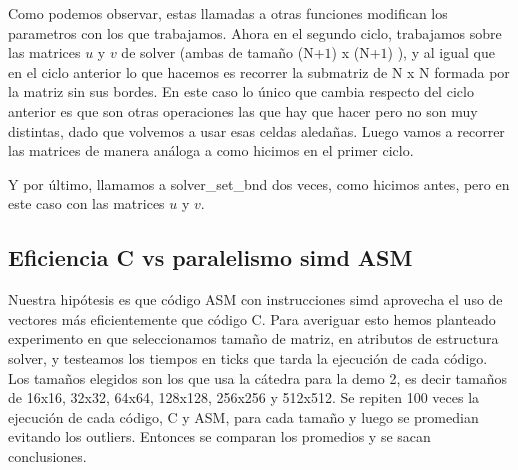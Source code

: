 \par Como podemos observar, estas llamadas a otras funciones modifican los parametros con los que trabajamos.
Ahora en el segundo ciclo, trabajamos sobre las matrices $u$ y $v$ de solver (ambas de tamaño (N+$1$) x (N+$1$) ), y al igual que en el ciclo anterior lo que hacemos es recorrer la submatriz de N x N formada por la matriz sin sus bordes.
En este caso lo único que cambia respecto del ciclo anterior es que son otras operaciones las que hay que hacer pero no son muy distintas, dado que volvemos a usar esas celdas aledañas.
Luego vamos a recorrer las matrices de manera análoga a como hicimos en el primer ciclo.
 \newline

\par Y por último, llamamos a solver\_set\_bnd dos veces, como hicimos antes, pero en este caso con las matrices $u$ y $v$.\newline

\subsection{Eficiencia C vs paralelismo simd ASM}
Nuestra hipótesis es que código ASM con instrucciones simd aprovecha el uso de vectores más eficientemente que código C. Para averiguar esto hemos planteado experimento en que seleccionamos tamaño de matriz, en atributos de estructura solver, y testeamos los tiempos en ticks que tarda la ejecución de cada código. Los tamaños elegidos son los que usa la cátedra para la demo 2, es decir tamaños de 16x16, 32x32, 64x64, 128x128, 256x256 y 512x512. Se repiten 100 veces la ejecución de cada código, C y ASM, para cada tamaño y luego se promedian evitando los outliers. Entonces se comparan los promedios y se sacan conclusiones.

